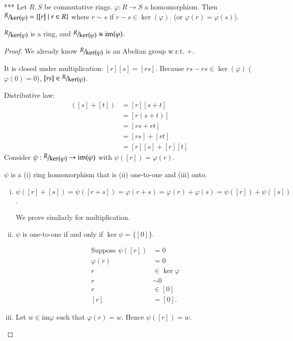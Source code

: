 \begin{defn}{***}
	Let $R,S$ be commutative rings. $\varphi: R\to S$ a homomorphism. Then $\nicefrac{R}{\ker(\varphi)}=\{[r]\mid r\in R\}$ where $r\sim s$ if $r-s\in\ker(\varphi)$. (or $\varphi(r) = \varphi(s)$). 
\end{defn}
\begin{theorem}
	$\nicefrac{R}{\ker(\varphi)}$ is a ring, and $\nicefrac{R}{\ker(\varphi)}\cong \mathrm{im}(\varphi)$. 
\end{theorem}
\begin{proof}
	We already know $\nicefrac{R}{\ker(\varphi)}$ is an Abelian group w.r.t. $+$. 
	
	It is closed under multiplication: $[r][s] = [rs]$. Because $rs-rs\in \ker(\varphi)$ ($\varphi(0) = 0$), $[rs]\in \nicefrac{R}{\ker(\varphi)}$. 
	
	Distributive law: 
	\begin{align*}
		[r]([s] + [t]) &= [r][s+t] \\
		&= [r(s+t)] \\
		&= [rs + rt] \\
		&= [rs] + [rt] \\
		&= [r][s] + [r][t]
	\end{align*}
Consider $\psi: \nicefrac{R}{\ker(\varphi)}\to \mathrm{im}(\varphi)$ with $\psi([r]) = \varphi(r)$. 

$\psi$ is a (i) ring homomorphism that is (ii) one-to-one and (iii) onto. 
\begin{enumerate}[(i)]
	\item $\psi([r]+[s]) = \psi([r+s]) = \varphi(r+s) = \varphi(r) + \varphi(s) = \psi([r]) + \psi([s])$. 
	
	We prove similarly for multiplication. 
	\item $\psi$ is one-to-one if and only if $\ker\psi = \{[0]\}$. 
	
	\begin{align*}
	\text{Suppose }\psi([r]) &= 0 \\
	\varphi(r) &= 0 \\
	r&\in \ker\varphi \\
	r&\sim 0 \\
	r&\in [0] \\
	[r] &= [0].
	\end{align*}
	
	\item Let $w\in \mathrm{im}\varphi$ such that $\varphi(r) = w$. Hence $\psi([r])=w$. 
\end{enumerate}
\end{proof}

